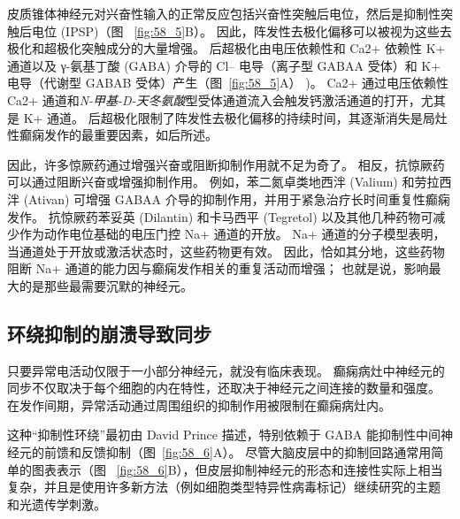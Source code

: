 皮质锥体神经元对兴奋性输入的正常反应包括兴奋性突触后电位，然后是抑制性突触后电位 (IPSP)（图 ~\ref{fig:58_5}B）。
因此，阵发性去极化偏移可以被视为这些去极化和超极化突触成分的大量增强。
后超极化由电压依赖性和 Ca2+ 依赖性 K+ 通道以及 γ-氨基丁酸 (GABA) 介导的 Cl– 电导（离子型 GABAA 受体）和 K+ 电导（代谢型 GABAB 受体）产生（图~\ref{fig:58_5}A） )。
Ca2+ 通过电压依赖性 Ca2+ 通道和\textit{N-甲基-D-天冬氨酸}型受体通道流入会触发钙激活通道的打开，尤其是 K+ 通道。
后超极化限制了阵发性去极化偏移的持续时间，其逐渐消失是局灶性癫痫发作的最重要因素，如后所述。


因此，许多惊厥药通过增强兴奋或阻断抑制作用就不足为奇了。
相反，抗惊厥药可以通过阻断兴奋或增强抑制作用。 例如，苯二氮卓类地西泮 (Valium) 和劳拉西泮 (Ativan) 可增强 GABAA 介导的抑制作用，并用于紧急治疗长时间重复性癫痫发作。
抗惊厥药苯妥英 (Dilantin) 和卡马西平 (Tegretol) 以及其他几种药物可减少作为动作电位基础的电压门控 Na+ 通道的开放。
Na+ 通道的分子模型表明，当通道处于开放或激活状态时，这些药物更有效。
因此，恰如其分地，这些药物阻断 Na+ 通道的能力因与癫痫发作相关的重复活动而增强；
也就是说，影响最大的是那些最需要沉默的神经元。



\subsection{环绕抑制的崩溃导致同步}

只要异常电活动仅限于一小部分神经元，就没有临床表现。
癫痫病灶中神经元的同步不仅取决于每个细胞的内在特性，还取决于神经元之间连接的数量和强度。
在发作间期，异常活动通过周围组织的抑制作用被限制在癫痫病灶内。


这种“抑制性环绕”最初由 David Prince 描述，特别依赖于 GABA 能抑制性中间神经元的前馈和反馈抑制（图~\ref{fig:58_6}A）。
尽管大脑皮层中的抑制回路通常用简单的图表表示（图 ~\ref{fig:58_6}B），但皮层抑制神经元的形态和连接性实际上相当复杂，并且是使用许多新方法（例如细胞类型特异性病毒标记）继续研究的主题 和光遗传学刺激。


